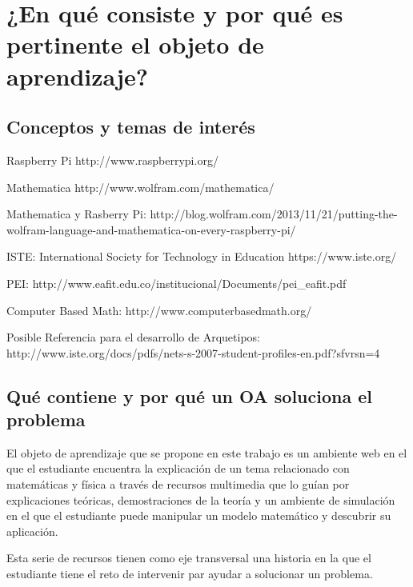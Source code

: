 \documentclass[twoside,letterpaper,11pt]{report}
\begin{document}

\section{¿En qué consiste y por qué es pertinente el objeto de aprendizaje?} %
\label{sec:_en_qu_consiste_y_por_qu_es_pertinente_el_objeto_de_aprendizaje_}

\subsection{Conceptos y temas de interés} %
\label{sub:conceptos_y_temas_de_inter_s}


 Raspberry Pi http://www.raspberrypi.org/

 Mathematica http://www.wolfram.com/mathematica/

 Mathematica y Rasberry Pi: http://blog.wolfram.com/2013/11/21/putting-the-wolfram-language-and-mathematica-on-every-raspberry-pi/

 ISTE: International Society for Technology in Education https://www.iste.org/

 PEI: http://www.eafit.edu.co/institucional/Documents/pei\_eafit.pdf

 Computer Based Math: http://www.computerbasedmath.org/


 Posible Referencia para el desarrollo de Arquetipos: http://www.iste.org/docs/pdfs/nets-s-2007-student-profiles-en.pdf?sfvrsn=4

\subsection{Qué contiene y por qué un OA soluciona el problema} %
\label{sub:qu_contiene_y_por_qu_un_oa_soluciona_el_problema}

El objeto de aprendizaje que se propone en este trabajo es un ambiente web en el que el estudiante encuentra la explicación de un tema relacionado con matemáticas y física a través de recursos multimedia que lo guían por explicaciones teóricas, demostraciones de la teoría y un ambiente de simulación en el que el estudiante puede manipular un modelo matemático y descubrir su aplicación.

Esta serie de recursos tienen como eje transversal una historia en la que el estudiante tiene el reto de intervenir par ayudar a solucionar un problema.
\end{document}
